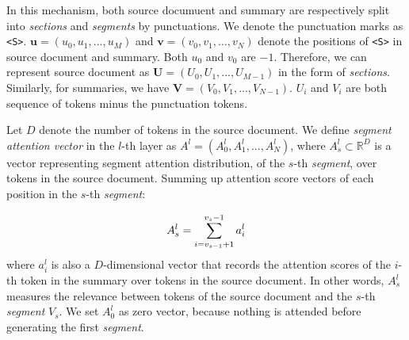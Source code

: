 In this mechanism, both source documuent and summary are 
respectively split into 
\textit{sections} and \textit{segments} by punctuations. We
denote the punctuation marks as \verb#<S>#.
$\mathbf{u}=(u_{0},u_{1},...,u_{M})$ 
and $\mathbf{v}=(v_{0},v_{1},...,v_{N})$
denote the positions of \verb#<S># in source document and summary.
Both $u_{0}$ and $v_{0}$ are $-1$.
Therefore, we can represent source document as $\mathbf{U}=(U_{0},U_{1},...,U_{M-1})$ in the form of \textit{sections}. Similarly, for summaries, we have $\mathbf{V}=(V_{0},V_{1},...,V_{N-1})$. 
$U_i$ and $V_i$ are
both sequence of tokens minus the punctuation tokens.

Let $D$ denote the number of tokens in the source document.
We define \textit{segment attention vector} in the $l$-th layer as 
$A^{l} = (A_{0}^{l}, A_{1}^{l},..., A_{N}^{l})$, 
where $A_s^l\subset \mathbb{R}^{D}$ is a vector representing 
segment attention distribution, of the $s$-th \textit{segment},
over tokens in the source document. Summing up attention score vectors 
of each position in the $s$-th \textit{segment}:

\begin{equation}
\small
    A_{s}^{l} = \sum_{i=v_{s-1}+1}^{v_{s}-1}a_{i}^{l}
\end{equation}
where $a_i^l$ is also a $D$-dimensional vector that records 
the attention scores of the $i$-th token in the summary over 
tokens in the source document. In other words, $ A_{s}^{l}$ 
measures the relevance between tokens of the source document and 
the $s$-th \textit{segment} $V_s$. 
We set $A_{0}^{l}$ as zero vector, because nothing is attended before generating 
the first \textit{segment}. 


